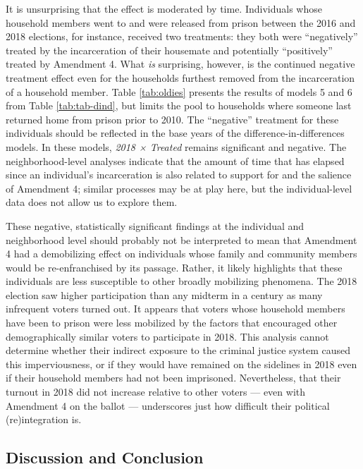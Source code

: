 \documentclass[
  12pt,
]{article}
\begin{document}
It is unsurprising that the effect is moderated by time. Individuals whose household members went to and were released from prison between the 2016 and 2018 elections, for instance, received two treatments: they both were ``negatively'' treated by the incarceration of their housemate and potentially ``positively'' treated by Amendment 4. What \emph{is} surprising, however, is the continued negative treatment effect even for the households furthest removed from the incarceration of a household member. Table \ref{tab:oldies} presents the results of models 5 and 6 from Table \ref{tab:tab-dind}, but limits the pool to households where someone last returned home from prison prior to 2010. The ``negative'' treatment for these individuals should be reflected in the base years of the difference-in-differences models. In these models, \emph{2018 × Treated} remains significant and negative. The neighborhood-level analyses indicate that the amount of time that has elapsed since an individual's incarceration is also related to support for and the salience of Amendment 4; similar processes may be at play here, but the individual-level data does not allow us to explore them.

\begin{singlespace}

\end{singlespace}

These negative, statistically significant findings at the individual and neighborhood level should probably not be interpreted to mean that Amendment 4 had a demobilizing effect on individuals whose family and community members would be re-enfranchised by its passage. Rather, it likely highlights that these individuals are less susceptible to other broadly mobilizing phenomena. The 2018 election saw higher participation than any midterm in a century as many infrequent voters turned out. It appears that voters whose household members have been to prison were less mobilized by the factors that encouraged other demographically similar voters to participate in 2018. This analysis cannot determine whether their indirect exposure to the criminal justice system caused this imperviousness, or if they would have remained on the sidelines in 2018 even if their household members had not been imprisoned. Nevertheless, that their turnout in 2018 did not increase relative to other voters --- even with Amendment 4 on the ballot --- underscores just how difficult their political (re)integration is.

\hypertarget{discussion-and-conclusion}{%
\subsection*{Discussion and Conclusion}\label{discussion-and-conclusion}}
\end{document}
